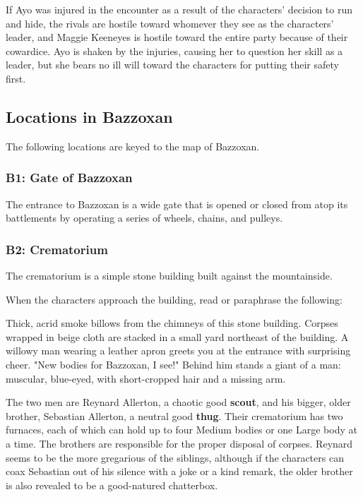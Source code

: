 \documentclass[a4paper, 11pt, bg=full, twocolumn, nooutline]{dndbook}
\begin{document}
If Ayo was injured in the encounter as a result of the characters' decision to run and hide, the rivals are hostile toward whomever they see as the characters' leader, and Maggie Keeneyes is hostile toward the entire party because of their cowardice. Ayo is shaken by the injuries, causing her to question her skill as a leader, but she bears no ill will toward the characters for putting their safety first.

\subsection{Locations in Bazzoxan}

The following locations are keyed to the map of Bazzoxan.



\subsubsection{B1: Gate of Bazzoxan}

The entrance to Bazzoxan is a wide gate that is opened or closed from atop its battlements by operating a series of wheels, chains, and pulleys.

\subsubsection{B2: Crematorium}

The crematorium is a simple stone building built against the mountainside.

When the characters approach the building, read or paraphrase the following:

\begin{DndReadAloud}
Thick, acrid smoke billows from the chimneys of this stone building. Corpses wrapped in beige cloth are stacked in a small yard northeast of the building.
A willowy man wearing a leather apron greets you at the entrance with surprising cheer. "New bodies for Bazzoxan, I see!" Behind him stands a giant of a man: muscular, blue-eyed, with short-cropped hair and a missing arm.
\end{DndReadAloud}

The two men are Reynard Allerton, a chaotic good \textbf{scout}, and his bigger, older brother, Sebastian Allerton, a neutral good \textbf{thug}. Their crematorium has two furnaces, each of which can hold up to four Medium bodies or one Large body at a time. The brothers are responsible for the proper disposal of corpses. Reynard seems to be the more gregarious of the siblings, although if the characters can coax Sebastian out of his silence with a joke or a kind remark, the older brother is also revealed to be a good-natured chatterbox.
\end{document}
